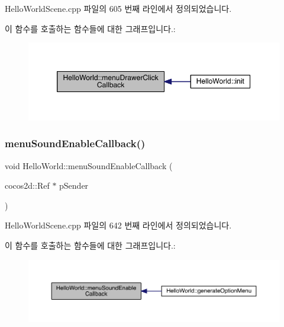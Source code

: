 Hello\+World\+Scene.\+cpp 파일의 605 번째 라인에서 정의되었습니다.

이 함수를 호출하는 함수들에 대한 그래프입니다.\+:
\nopagebreak
\begin{figure}[H]
\begin{center}
\leavevmode
\includegraphics[width=350pt]{class_hello_world_a1609fd202ff4b899571aeb34b3cdaed4_icgraph}
\end{center}
\end{figure}
\mbox{\label{class_hello_world_aa0aab5c2537449752853c2924db53261}} 
\subsubsection{\texorpdfstring{menu\+Sound\+Enable\+Callback()}{menuSoundEnableCallback()}}
{\footnotesize\ttfamily void Hello\+World\+::menu\+Sound\+Enable\+Callback (\begin{DoxyParamCaption}\item[{cocos2d\+::\+Ref $\ast$}]{p\+Sender }\end{DoxyParamCaption})}



Hello\+World\+Scene.\+cpp 파일의 642 번째 라인에서 정의되었습니다.

이 함수를 호출하는 함수들에 대한 그래프입니다.\+:
\nopagebreak
\begin{figure}[H]
\begin{center}
\leavevmode
\includegraphics[width=350pt]{class_hello_world_aa0aab5c2537449752853c2924db53261_icgraph}
\end{center}
\end{figure}
\mbox{\label{class_hello_world_a38047ef68d46872dd39be5d4cc59ad18}} 
